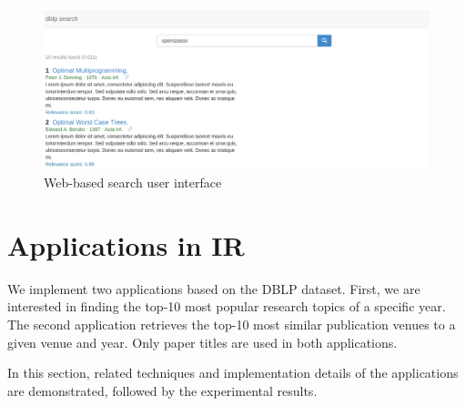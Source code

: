 \documentclass{sig-alternate-05-2015}
\begin{document}
\begin{figure}[th]
\centering
\includegraphics[width=.8\textwidth]{img/search}
\caption{Web-based search user interface}
\label{fig:search}
\end{figure}

\section{Applications in IR} \label{sec:ir}
We implement two applications based on the DBLP dataset. First, we are interested in finding the top-10 most popular research topics of a specific year. The second application retrieves the top-10 most similar publication venues to a given venue and year. Only paper titles are used in both applications.

In this section, related techniques and implementation details of the applications are demonstrated, followed by the experimental results.
\end{document}
